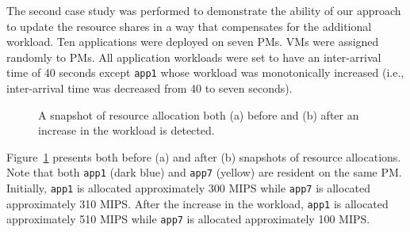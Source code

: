 The second case study was performed to demonstrate the ability of our approach to update the resource shares in a way that compensates for the additional workload. Ten applications were deployed on seven PMs.  VMs were assigned randomly to PMs.  All application workloads were set to have an inter-arrival time of 40 seconds except \texttt{app1} whose workload was monotonically increased (i.e., inter-arrival time was decreased from 40 to seven seconds).
\begin{figure}[h]
	\centering
	\qquad
	\caption[A snapshot of resource allocation both before and after an increase in the workload is detected.]
	{A snapshot of resource allocation both (a) before and (b) after an increase in the workload is detected.}	\label{fig:case-study2} 
\end{figure}
Figure~\ref{fig:case-study2} presents both before (a) and after (b) snapshots of resource allocations.  Note that both \texttt{app1} (dark blue) and \texttt{app7} (yellow) are resident on the same PM.  Initially, \texttt{app1} is allocated approximately 300 MIPS while \texttt{app7} is allocated approximately 310 MIPS. After the increase in the workload, \texttt{app1} is allocated approximately 510 MIPS while \texttt{app7} is allocated approximately 100 MIPS.

